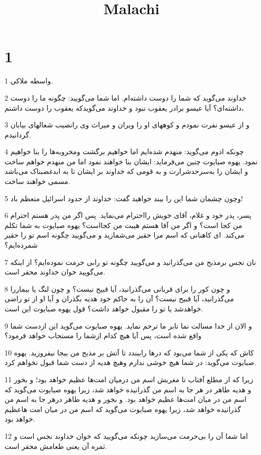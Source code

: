 

\title{Malachi}


\chapter{1}

\par 1 واسطه ملاکی.
\par 2 خداوند می‌گوید که شما را دوست داشته‌ام. اما شما می‌گویید: چگونه ما را دوست داشته‌ای؟ آیا عیسو برادر یعقوب نبود و خداوند می‌گویدکه یعقوب را دوست داشتم،
\par 3 و از عیسو نفرت نمودم و کوههای او را ویران و میراث وی رانصیب شغالهای بیابان گردانیدم.
\par 4 چونکه ادوم می‌گوید: منهدم شده‌ایم اما خواهیم برگشت ومخروبه‌ها را بنا خواهیم نمود. یهوه صبایوت چنین می‌فرماید: ایشان بنا خواهند نمود اما من منهدم خواهم ساخت و ایشان را به‌سرحدشرارت و به قومی که خداوند بر ایشان تا به ابدغضبناک می‌باشد مسمی خواهند ساخت.
\par 5 وچون چشمان شما این را بیند خواهید گفت: خداوند از حدود اسرائیل متعظم باد!
\par 6 پسر، پدر خود و غلام، آقای خویش رااحترام می‌نماید. پس اگر من پدر هستم احترام من کجا است؟ و اگر من آقا هستم هیبت من کجااست؟ یهوه صبایوت به شما تکلم می‌کند. ای کاهنانی که اسم مرا حقیر می‌شمارید و می‌گویید چگونه اسم تو را حقیر شمرده‌ایم؟
\par 7 نان نجس برمذبح من می‌گذرانید و می‌گویید چگونه تو رابی حرمت نموده‌ایم؟ از اینکه می‌گویید خوان خداوند محقر است.
\par 8 و چون کور را برای قربانی می‌گذرانید، آیا قبیح نیست؟ و چون لنگ یا بیماررا می‌گذرانید، آیا قبیح نیست؟ آن را به حاکم خود هدیه بگذران و آیا او از تو راضی خواهدشد یا تو را مقبول خواهد داشت؟ قول یهوه صبایوت این است.
\par 9 و الان از خدا مسالت نما تابر ما ترحم نماید. یهوه صبایوت می‌گوید این ازدست شما واقع شده است، پس آیا هیچ کدام ازشما را مستجاب خواهد فرمود؟
\par 10 کاش که یکی از شما می‌بود که درها راببندد تا آتش بر مذبح من بیجا نیفروزید. یهوه صبایوت می‌گوید: در شما هیچ خوشی ندارم وهیچ هدیه از دست شما قبول نخواهم کرد.
\par 11 زیرا که از مطلع آفتاب تا مغربش اسم من درمیان امت‌ها عظیم خواهد بود؛ و بخور و هدیه طاهر در هر جا به اسم من گذرانیده خواهد شد، زیرا یهوه صبایوت می‌گوید که اسم من در میان امت‌ها عظیم خواهد بود. و بخور و هدیه طاهر درهر جا به اسم من گذرانیده خواهد شد، زیرا یهوه صبایوت می‌گوید که اسم من در میان امت هاعظیم خواهد بود.
\par 12 اما شما آن را بی‌حرمت می‌سازید چونکه می‌گویید که خوان خداوند نجس است و ثمره آن یعنی طعامش محقر است.
